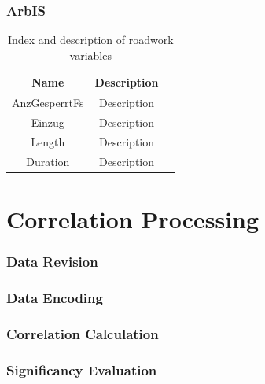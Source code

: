 \subsubsection{ArbIS}


\noindent
\begin{table}[ht]
	\centering
	\begin{tabular}{c|c|l} 
		\toprule
		Name & Description \\
		\midrule 
		AnzGesperrtFs & Description \\
		Einzug & Description \\
		Length & Description \\
		Duration & Description \\
		\bottomrule
	\end{tabular}
	\caption{Index and description of roadwork variables}
\end{table}
 
\section{Correlation Processing}
\label{methodology_correlation_processing}

\subsubsection{Data Revision}


\subsubsection{Data Encoding}


\subsubsection{Correlation Calculation}


\subsubsection{Significancy Evaluation}


